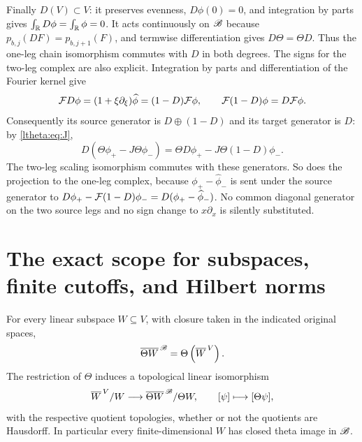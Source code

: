 \documentclass[11pt]{article}
\begin{document}
Finally $D(V)\subset V$: it preserves evenness, $D\phi(0)=0$, and
integration by parts gives $\int_\mathbb R D\phi=\int_\mathbb R\phi=0$.
It acts continuously on $\mathscr B$ because $p_{b,j}(DF)=p_{b,j+1}(F)$,
and termwise differentiation gives $D\Theta=\Theta D$. Thus the
one-leg chain isomorphism commutes with $D$ in both degrees.
The signs for the two-leg complex are also explicit. Integration by
parts and differentiation of the Fourier kernel give
\[
 \mathcal F D\phi=(1+\xi\partial_\xi)\widehat\phi
           =(1-D)\mathcal F\phi,
 \qquad \mathcal F(1-D)\phi=D\mathcal F\phi.
\]
Consequently its source generator is $D\oplus(1-D)$ and its target
generator is $D$: by \eqref{ltheta:eq:J},
\[
 D(\Theta\phi_+-J\Theta\phi_-)
    =\Theta D\phi_+-J\Theta(1-D)\phi_-.
\]
The two-leg scaling isomorphism commutes with these generators.
So does the projection to the one-leg complex, because
$\phi_+-\widehat\phi_-$ is sent under the source generator to
$D\phi_+-\mathcal F(1-D)\phi_-=D(\phi_+-\widehat\phi_-)$.
No common diagonal generator on the two source legs and no sign
change to $x\partial_x$ is silently substituted.

\section{The exact scope for subspaces, finite cutoffs, and Hilbert norms}

\begin{lthetaproposition}\label{ltheta:prop:subspace}
For every linear subspace $W\subseteq V$, with closure taken in the
indicated original spaces,
\begin{equation}\label{ltheta:eq:W}
 \overline{\Theta W}^{\,\mathscr B}
       =\Theta\left(\overline W^{\,V}\right).
\end{equation}
The restriction of $\Theta$ induces a topological linear isomorphism
\[
 \overline W^{\,V}/W
       \longrightarrow\overline{\Theta W}^{\,\mathscr B}/\Theta W,
 \qquad[\psi]\longmapsto[\Theta\psi],
\]
with the respective quotient topologies, whether or not the quotients
are Hausdorff. In particular every finite-dimensional $W$ has closed
theta image in $\mathscr B$.
\end{lthetaproposition}
\end{document}
